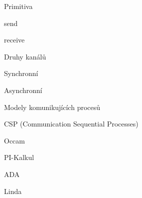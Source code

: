 \begin{compactitem}
    \item Primitiva \begin{compactitem}
        \item send
        \item receive
    \end{compactitem}

    \item Druhy kanálů \begin{compactitem}
        \item Synchronní
        \item Asynchronní
    \end{compactitem}

    \item Modely komunikujících procesů \begin{compactitem}
        \item CSP (Communication Sequential Processes)
        \item Occam
        \item PI-Kalkul
        \item ADA
        \item Linda
    \end{compactitem}
\end{compactitem}
